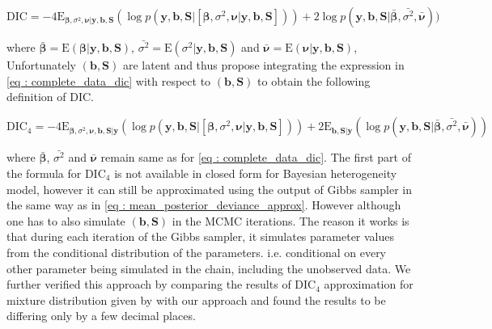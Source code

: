 \begin{equation}
\label{eq : complete_data_dic}
\text{DIC} = -4\text{E}_{\boldsymbol{\beta}, \sigma^2, \boldsymbol{\nu}|\boldsymbol{y}, \boldsymbol{b}, \boldsymbol{S}}(\log{p(\boldsymbol{y}, \boldsymbol{b}, \boldsymbol{S}|[\boldsymbol{\beta}, \sigma^2, \boldsymbol{\nu}|\boldsymbol{y}, \boldsymbol{b}, \boldsymbol{S}])}) + 
2\log{p(\boldsymbol{y}, \boldsymbol{b}, \boldsymbol{S}|\boldsymbol{\bar{\beta}}, \bar{\sigma^2}, \boldsymbol{\bar{\nu}})})
\end{equation}

where 
$\boldsymbol{\bar{\beta}}=\text{E}(\boldsymbol{\beta}|\boldsymbol{y}, \boldsymbol{b}, \boldsymbol{S})$, 
$\bar{\sigma^2}=\text{E}(\sigma^2|\boldsymbol{y}, \boldsymbol{b}, \boldsymbol{S})$ and 
$\boldsymbol{\bar{\nu}}=\text{E}(\boldsymbol{\nu}|\boldsymbol{y}, \boldsymbol{b}, \boldsymbol{S})$,\\

Unfortunately $(\boldsymbol{b}, \boldsymbol{S})$ are latent and thus \citet{celeux_deviance_2006} propose integrating the expression in \ref{eq : complete_data_dic} with respect to $(\boldsymbol{b}, \boldsymbol{S})$ to obtain the following definition of DIC.

\begin{equation}
\label{eq : DIC4}
\text{DIC}_4 = -4\text{E}_{\boldsymbol{\beta}, \sigma^2, \boldsymbol{\nu},\boldsymbol{b}, \boldsymbol{S}|\boldsymbol{y}}(\log{p(\boldsymbol{y}, \boldsymbol{b}, \boldsymbol{S}|[\boldsymbol{\beta}, \sigma^2, \boldsymbol{\nu}|\boldsymbol{y}, \boldsymbol{b}, \boldsymbol{S}])}) + 
2\text{E}_{\boldsymbol{b},\boldsymbol{S}|\boldsymbol{y}}(\log{p(\boldsymbol{y}, \boldsymbol{b}, \boldsymbol{S}|\boldsymbol{\bar{\beta}}, \bar{\sigma^2}, \boldsymbol{\bar{\nu}})})
\end{equation}

where 
$\boldsymbol{\bar{\beta}}$, $\bar{\sigma^2}$ and $\boldsymbol{\bar{\nu}}$ remain same as for \ref{eq : complete_data_dic}. The first part of the formula for $\text{DIC}_4$ is not available in closed form for Bayesian heterogeneity model, however it can still be approximated using the output of Gibbs sampler in the same way as in \ref{eq : mean_posterior_deviance_approx}. However although one has to also simulate $(\boldsymbol{b}, \boldsymbol{S})$ in the MCMC iterations. The reason it works is that during each iteration of the Gibbs sampler, it simulates parameter values from the conditional distribution of the parameters. i.e. conditional on every other parameter being simulated in the chain, including the unobserved data. We further verified this approach by comparing the results of $\text{DIC}_4$ approximation for mixture distribution given by \citet{celeux_deviance_2006} with our approach and found the results to be differing only by a few decimal places.\\

